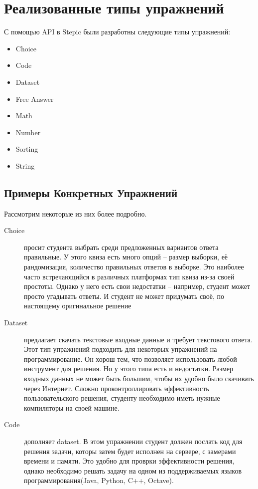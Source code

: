 \documentclass{matmex-diploma-custom}
\begin{document}
\section{Реализованные типы упражнений}

С помощью API в Stepic были разработны следующие типы упражнений:
\begin{itemize}
\item Choice
\item Code
\item Dataset
\item Free Answer
\item Math
\item Number
\item Sorting
\item String
\end{itemize}

\subsection*{Примеры Конкретных Упражнений}
Рассмотрим некоторые из них более подробно.
\begin{description}
\item[Choice] просит студента выбрать среди предложенных вариантов
ответа правильные. У этого квиза есть много опций -- размер выборки,
её рандомизация, количество правильных ответов в выборке. Это наиболее
часто встречающийся в различных платформах тип квиза из-за своей
простоты. Однако у него есть свои недостатки -- например, студент
может просто угадывать ответы. И студент не может придумать своё, по
настоящему оригинальное решение

\item[Dataset] предлагает скачать текстовые входные данные и требует
текстового ответа. Этот тип упражнений подходить для некоторых
упражнений на программирование. Он хорош тем, что позволяет
использовать любой инструмент для решения. Но у этого типа есть и
недостатки. Размер входных данных не может быть большим, чтобы их
удобно было скачивать через Интернет. Сложно проконтроллировать
эффективность пользовательского решения, студенту необходимо иметь
нужные компиляторы на своей машине.

\item[Code] дополняет dataset. В этом упражнении студент должен
послать код для решения задачи, которы затем будет исполнен на
сервере, с замерами времени и памяти. Это удобно для проврки
эффективности решения, однако необходимо решать задачу на одном из
поддерживаемых языков программирования(Java, Python, C++, Octave).
\end{description}
\end{document}
